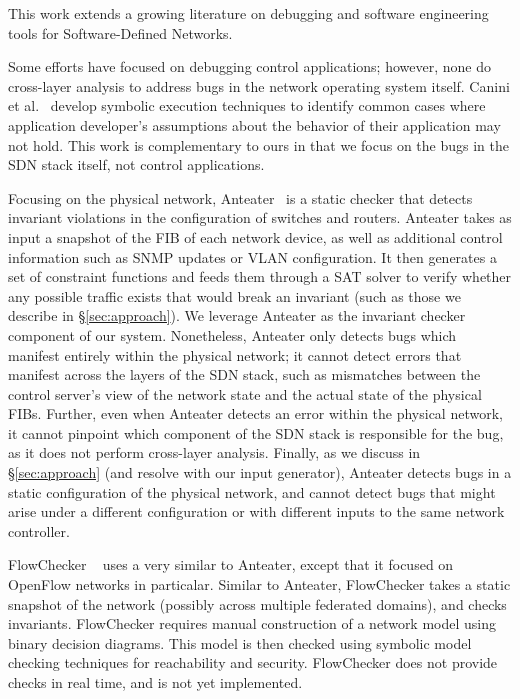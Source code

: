 
This work extends a growing literature on debugging and software engineering tools for
Software-Defined Networks.
    
Some efforts have focused on debugging control applications; however, none do 
cross-layer analysis to address bugs in the network operating system itself. 
Canini et al.~\cite{nice} develop symbolic execution techniques to identify
common cases where application developer's assumptions about the behavior of
their application may not hold. This work is complementary to ours in
that we focus on the bugs in the SDN stack itself, not control applications.

Focusing on the physical network, Anteater~\cite{anteater} is a static checker that
detects invariant violations in the configuration of switches and routers.
Anteater takes as input a snapshot of the FIB of each network device, as well as
additional control information such as SNMP updates or VLAN configuration. It then
generates a set of constraint functions and feeds them through a SAT solver to verify whether
any possible traffic exists that would break an invariant (such as those we describe in \S\ref{sec:approach}).
We leverage
Anteater as the invariant checker component of our system.
Nonetheless, Anteater only detects bugs which manifest entirely within the physical network;  
it cannot detect errors that manifest across the layers of the SDN stack, such as mismatches
between the control server's view of the network state and the actual state of the
physical FIBs. Further, even when Anteater detects an error within the physical network, it cannot pinpoint
which component of the SDN stack is responsible for the bug, as it does not perform cross-layer
analysis. Finally, as we discuss in \S\ref{sec:approach} (and resolve with our input generator), 
Anteater detects bugs in a static configuration
of the physical network, and cannot detect bugs that might arise under a different configuration or with different
inputs to the same network controller.


FlowChecker ~\cite{flowchecker} uses a very similar to Anteater, except that
it focused on OpenFlow networks in particalar.  Similar to Anteater, FlowChecker
takes a static snapshot of the network (possibly across multiple federated
domains), and checks invariants. FlowChecker requires manual construction of a
network model using binary decision diagrams. This model is then checked using symbolic model checking
techniques for reachability and security. FlowChecker does not provide checks in real
time, and is not yet implemented.

